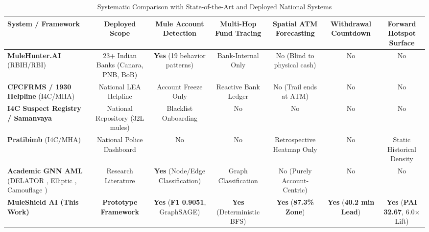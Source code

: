 \documentclass[conference]{IEEEtran}
\begin{document}
\begin{table}[t]
\caption{Systematic Comparison with State-of-the-Art and Deployed National Systems}
\label{tab:comparison_prior_art}
\centering
\begin{adjustbox}{width=\textwidth}
\begin{tabular}{lcccccc}
\toprule
\textbf{System / Framework} & \textbf{Deployed Scope} & \textbf{Mule Account Detection} & \textbf{Multi-Hop Fund Tracing} & \textbf{Spatial ATM Forecasting} & \textbf{Withdrawal Countdown} & \textbf{Forward Hotspot Surface} \\
\midrule
\textbf{MuleHunter.AI} (RBIH/RBI) \cite{mulehunter} & 23+ Indian Banks (Canara, PNB, BoB) & \textbf{Yes} (19 behavior patterns) & Bank-Internal Only & No (Blind to physical cash) & No & No \\
\textbf{CFCFRMS / 1930 Helpline} (I4C/MHA) \cite{i4creport} & National LEA Helpline & Account Freeze Only & Reactive Bank Ledger & No (Trail ends at ATM) & No & No \\
\textbf{I4C Suspect Registry / Samanvaya} & National Repository (32L mules) & Blacklist Onboarding & No & No & No & No \\
\textbf{Pratibimb} (I4C/MHA) & National Police Dashboard & No & No & Retrospective Heatmap Only & No & Static Historical Density \\
\textbf{Academic GNN AML} (DELATOR \cite{assumpção2022}, Elliptic \cite{weber2019}, Camouflage \cite{dou2020}) & Research Literature & \textbf{Yes} (Node/Edge Classification) & Graph Classification & No (Purely Account-Centric) & No & No \\
\midrule
\textbf{MuleShield AI (This Work)} & \textbf{Prototype Framework} & \textbf{Yes} (\textbf{F1 0.9051}, GraphSAGE) & \textbf{Yes} (Deterministic BFS) & \textbf{Yes} (\textbf{87.3\% Zone}) & \textbf{Yes} (\textbf{40.2 min Lead}) & \textbf{Yes} (\textbf{PAI 32.67}, 6.0$\times$ Lift) \\
\bottomrule
\end{tabular}
\end{adjustbox}
\end{table}
\end{document}
